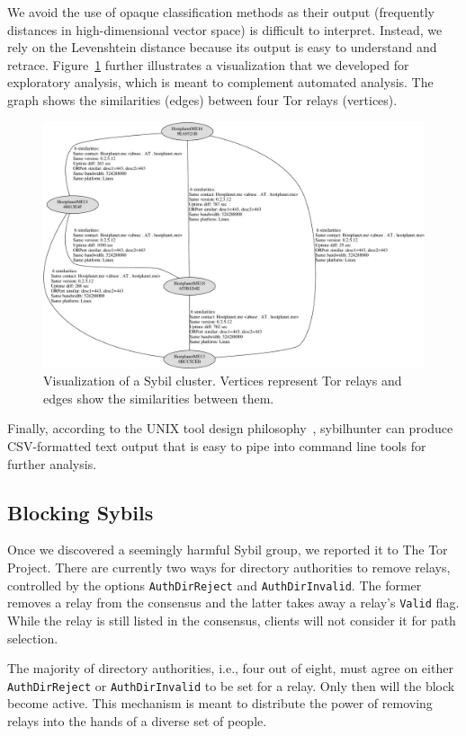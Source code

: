 We avoid the use of opaque classification methods as their output (frequently
distances in high-dimensional vector space) is difficult to interpret.  Instead,
we rely on the Levenshtein distance because its output is easy to understand and
retrace.  Figure~\ref{fig:visualization} further illustrates a visualization
that we developed for exploratory analysis, which is meant to complement
automated analysis.  The graph shows the similarities (edges) between four Tor
relays (vertices).

\begin{figure}[t]
	\centering
	\includegraphics[width=\linewidth]{diagrams/visualization.pdf}
    \caption{Visualization of a Sybil cluster.  Vertices represent Tor relays
    and edges show the similarities between them.}
	\label{fig:visualization}
\end{figure}

Finally, according to the UNIX tool design philosophy~\cite{Pike1983a},
sybilhunter can produce CSV-formatted text output that is easy to pipe into
command line tools for further analysis.

\subsection{Blocking Sybils}
\label{sec:blocking-sybils}
Once we discovered a seemingly harmful Sybil group, we reported it to The Tor
Project.  There are currently two ways for directory authorities to remove
relays, controlled by the options \texttt{AuthDirReject} and
\texttt{AuthDirInvalid}.  The former removes a relay from the consensus and the
latter takes away a relay's \texttt{Valid} flag.  While the relay is still
listed in the consensus, clients will not consider it for path selection.

The majority of directory authorities, i.e., four out of eight, must agree on
either \texttt{AuthDirReject} or \texttt{AuthDirInvalid} to be set for a relay.
Only then will the block become active.  This mechanism is meant to distribute
the power of removing relays into the hands of a diverse set of people.
